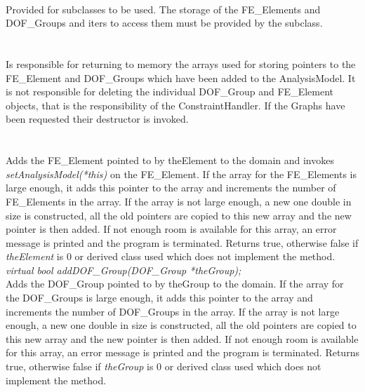   \\
Provided for subclasses to be used. The storage of the FE\_Elements
and DOF\_Groups and iters to access them must be provided by the
subclass. \\

  \\
  \\
Is responsible for returning to memory the arrays used for storing
pointers to the FE\_Element and DOF\_Groups which have been added to
the AnalysisModel. It is not responsible for deleting the individual
DOF\_Group and FE\_Element objects, that is the responsibility of the
ConstraintHandler. If the Graphs have been requested their destructor
is invoked.\\ 

  \\
  \\
Adds the FE\_Element pointed to by \p theElement to the domain and
invokes {\em setAnalysisModel(*this)} on the FE\_Element. If the
array for the FE\_Elements is large enough, it adds this pointer to
the array and increments the number of FE\_Elements in the array. If
the array is not large enough, a new one double in size is
constructed, all the old pointers are copied to this new array and the
new pointer is then added. If not enough room is available for this
array, an error message is printed and the program is
terminated. Returns \p true, otherwise \p false if {\em
theElement} is $0$ or derived class used which does not implement the
method. \\ 

{\em virtual bool addDOF\_Group(DOF\_Group *theGroup);}  \\
Adds the DOF\_Group pointed to by \p theGroup to the domain. If the
array for the DOF\_Groups is large enough, it adds this pointer to
the array and increments the number of DOF\_Groups in the array. If
the array is not large enough, a new one double in size is
constructed, all the old pointers are copied to this new array and the
new pointer is then added. If not enough room is available for this
array, an error message is printed and the program is
terminated. Returns \p true, otherwise \p false if {\em
theGroup} is $0$ or derived class used which does not implement the
method. \\ 



